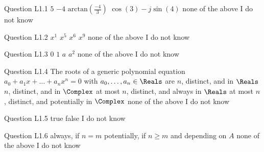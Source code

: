\begin{frame}{Question L1.1}
	\QuestionNotes{}
	\QuestionAnswers
	{
		\answer $5$
		\answer $-4$
		\correctanswer $\mathrm{arctan} \left(\frac{-4}{3}\right)$
		\answer $\cos(3)-j\sin(4)$
		\answer none of the above
		\answer I do not know
	}
\end{frame}


\begin{frame}{Question L1.2}
	\QuestionNotes{}
	\QuestionAnswers
	{
		\answer $x^1$
		\answer $x^5$
		\correctanswer $x^6$
		\answer $x^9$
		\answer none of the above
		\answer I do not know
	}
\end{frame}


\begin{frame}{Question L1.3}
	\QuestionNotes{}
	\QuestionAnswers
	{
		\answer $0$
		\correctanswer $1$
		\answer $a$
		\answer $a^2$
		\answer none of the above
		\answer I do not know
	}
\end{frame}


\begin{frame}{Question L1.4}
	\QuestionNotes{}
	\QuestionBody
	{
		The roots of a generic polynomial equation
		$
		a_{0} + a_{1} x + \ldots + a_{n} x^{n} = 0
		$
		with $a_{0}, \ldots, a_{n} \in \Reals$ are 
	}
	\QuestionAnswers
	{
		\answer $n$, distinct, and in $\Reals$
		\answer $n$, distinct, and in $\Complex$
		\answer at most $n$, distinct, and always in $\Reals$
		\correctanswer at most $n$, distinct, and potentially in $\Complex$
		\answer none of the above
		\answer I do not know
	}
\end{frame}


\begin{frame}{Question L1.5}
	\QuestionNotes{}
	\QuestionAnswers
	{
		\answer true
		\correctanswer false
		\answer I do not know
	}
\end{frame}


\begin{frame}{Question L1.6}
	\QuestionNotes{}
	\QuestionAnswers
	{
		\answer always, if $n=m$
		\correctanswer potentially, if $n\geq m$ and depending on $A$
		\answer none of the above
		\answer I do not know
	}
\end{frame}


